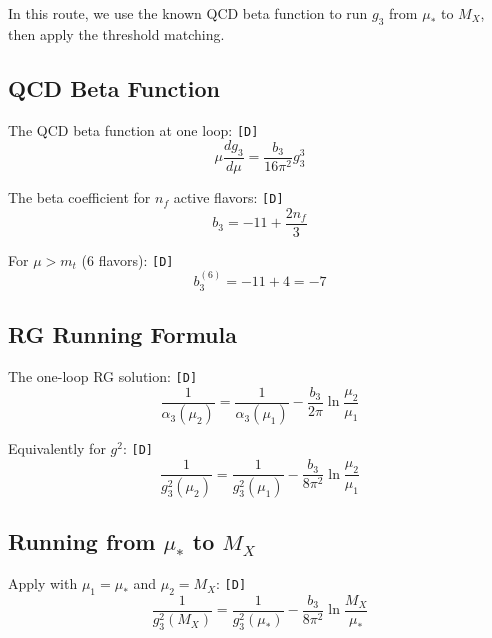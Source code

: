 \documentclass[11pt,a4paper]{article}
\newcommand{\tagD}{\textcolor{green!50!black}{\texttt{[D]}}}
\theoremstyle{definition}
\begin{document}
\begin{routebox}
In this route, we use the known QCD beta function to run $g_3$ from $\mu_*$
to $M_X$, then apply the threshold matching.
\end{routebox}

\subsection{QCD Beta Function}
\label{subsec:qcd-beta}

The QCD beta function at one loop: \tagD{}
\begin{equation}
\label{eq:qcd-beta}
\mu \frac{dg_3}{d\mu} = \frac{b_3}{16\pi^2} g_3^3
\end{equation}

The beta coefficient for $n_f$ active flavors: \tagD{}
\begin{equation}
\label{eq:b3-nf}
b_3 = -11 + \frac{2n_f}{3}
\end{equation}

For $\mu > m_t$ (6 flavors): \tagD{}
\begin{equation}
\label{eq:b3-six}
b_3^{(6)} = -11 + 4 = -7
\end{equation}

\subsection{RG Running Formula}
\label{subsec:rg-running}

The one-loop RG solution: \tagD{}
\begin{equation}
\label{eq:rg-solution}
\frac{1}{\alpha_3(\mu_2)} = \frac{1}{\alpha_3(\mu_1)} - \frac{b_3}{2\pi} \ln\frac{\mu_2}{\mu_1}
\end{equation}

Equivalently for $g^2$: \tagD{}
\begin{equation}
\label{eq:rg-g-squared}
\frac{1}{g_3^2(\mu_2)} = \frac{1}{g_3^2(\mu_1)} - \frac{b_3}{8\pi^2} \ln\frac{\mu_2}{\mu_1}
\end{equation}

\subsection{Running from $\mu_*$ to $M_X$}
\label{subsec:running-mustar-mx}

Apply with $\mu_1 = \mu_*$ and $\mu_2 = M_X$: \tagD{}
\begin{equation}
\label{eq:running-mustar-mx}
\frac{1}{g_3^2(M_X)} = \frac{1}{g_3^2(\mu_*)} - \frac{b_3}{8\pi^2} \ln\frac{M_X}{\mu_*}
\end{equation}
\end{document}
